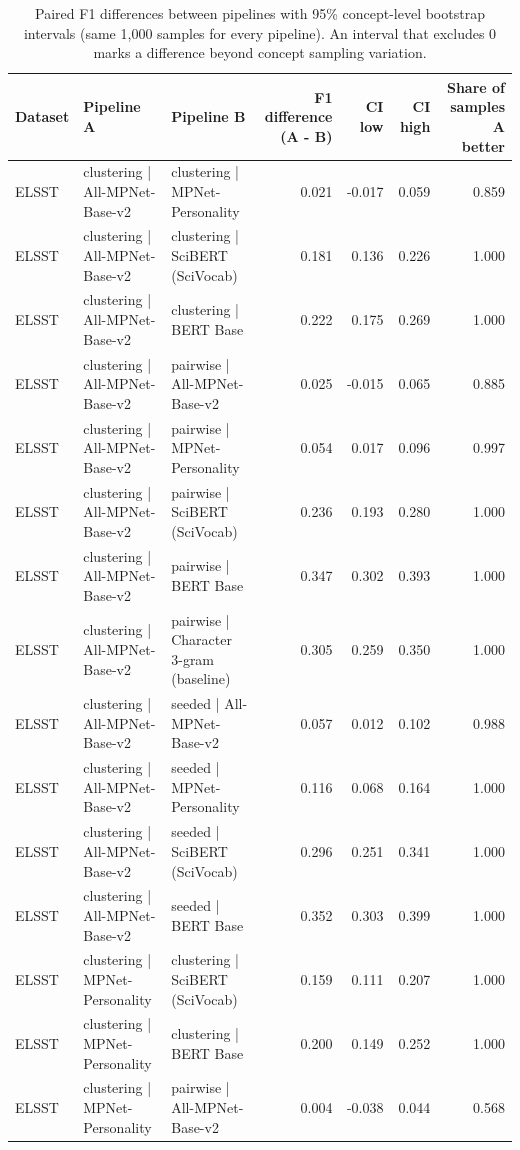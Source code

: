 \begin{table}[ht]
\centering
\small
\caption{Paired F1 differences between pipelines with 95\% concept-level bootstrap intervals (same 1,000 samples for every pipeline). An interval that excludes 0 marks a difference beyond concept sampling variation.}
\label{tab:S6_f1_differences}
\begin{tabular}{lllrrrr}
\toprule
Dataset & Pipeline A & Pipeline B & F1 difference (A - B) & CI low & CI high & Share of samples A better \\
\midrule
ELSST & clustering | All-MPNet-Base-v2 & clustering | MPNet-Personality & 0.021 & -0.017 & 0.059 & 0.859 \\
ELSST & clustering | All-MPNet-Base-v2 & clustering | SciBERT (SciVocab) & 0.181 & 0.136 & 0.226 & 1.000 \\
ELSST & clustering | All-MPNet-Base-v2 & clustering | BERT Base & 0.222 & 0.175 & 0.269 & 1.000 \\
ELSST & clustering | All-MPNet-Base-v2 & pairwise | All-MPNet-Base-v2 & 0.025 & -0.015 & 0.065 & 0.885 \\
ELSST & clustering | All-MPNet-Base-v2 & pairwise | MPNet-Personality & 0.054 & 0.017 & 0.096 & 0.997 \\
ELSST & clustering | All-MPNet-Base-v2 & pairwise | SciBERT (SciVocab) & 0.236 & 0.193 & 0.280 & 1.000 \\
ELSST & clustering | All-MPNet-Base-v2 & pairwise | BERT Base & 0.347 & 0.302 & 0.393 & 1.000 \\
ELSST & clustering | All-MPNet-Base-v2 & pairwise | Character 3-gram (baseline) & 0.305 & 0.259 & 0.350 & 1.000 \\
ELSST & clustering | All-MPNet-Base-v2 & seeded | All-MPNet-Base-v2 & 0.057 & 0.012 & 0.102 & 0.988 \\
ELSST & clustering | All-MPNet-Base-v2 & seeded | MPNet-Personality & 0.116 & 0.068 & 0.164 & 1.000 \\
ELSST & clustering | All-MPNet-Base-v2 & seeded | SciBERT (SciVocab) & 0.296 & 0.251 & 0.341 & 1.000 \\
ELSST & clustering | All-MPNet-Base-v2 & seeded | BERT Base & 0.352 & 0.303 & 0.399 & 1.000 \\
ELSST & clustering | MPNet-Personality & clustering | SciBERT (SciVocab) & 0.159 & 0.111 & 0.207 & 1.000 \\
ELSST & clustering | MPNet-Personality & clustering | BERT Base & 0.200 & 0.149 & 0.252 & 1.000 \\
ELSST & clustering | MPNet-Personality & pairwise | All-MPNet-Base-v2 & 0.004 & -0.038 & 0.044 & 0.568 \\

\end{tabular}
\end{table}
